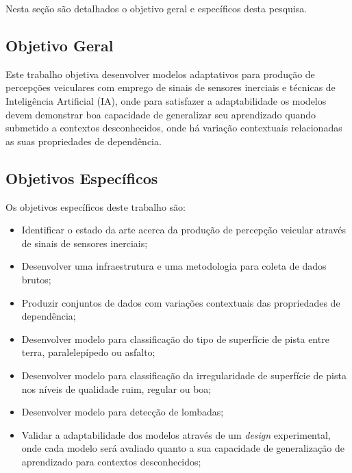 Nesta seção são detalhados o objetivo geral e específicos desta pesquisa.

\subsection{Objetivo Geral}

Este trabalho objetiva desenvolver modelos adaptativos para produção de percepções veiculares com emprego de sinais de sensores inerciais e técnicas de Inteligência Artificial (IA), onde para satisfazer a adaptabilidade os modelos devem demonstrar boa capacidade de generalizar seu aprendizado quando submetido a contextos desconhecidos, onde há variação contextuais relacionadas as suas propriedades de dependência.

\subsection{Objetivos Específicos}

Os objetivos específicos deste trabalho são:

\begin{itemize}

\item Identificar o estado da arte acerca da produção de percepção veicular através de sinais de sensores inerciais;

\item Desenvolver uma infraestrutura e uma metodologia para coleta de dados brutos;

\item Produzir conjuntos de dados com variações contextuais das propriedades de dependência;

\item Desenvolver modelo para classificação do tipo de superfície de pista entre terra, paralelepípedo ou asfalto;

\item Desenvolver modelo para classificação da irregularidade de superfície de pista nos níveis de qualidade ruim, regular ou boa;

\item Desenvolver modelo para detecção de lombadas;

\item Validar a adaptabilidade dos modelos através de um \textit{design} experimental, onde cada modelo será avaliado quanto a sua capacidade de generalização de aprendizado para contextos desconhecidos;

\end{itemize}

